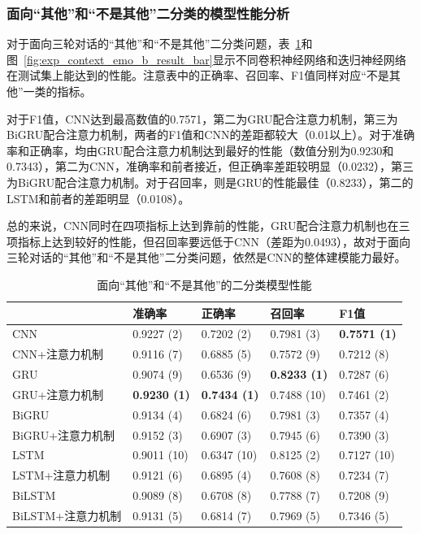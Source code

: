 \subsubsection{面向“其他”和“不是其他”二分类的模型性能分析}
\label{sssec:exp_context_emo_b_base}

对于面向三轮对话的“其他”和“不是其他”二分类问题，表~\ref{tab:exp_context_emo_b_result}和图~\ref{fig:exp_context_emo_b_result_bar}显示不同卷积神经网络和迭归神经网络在测试集上能达到的性能。注意表中的正确率、召回率、F1值同样对应“不是其他”一类的指标。

对于F1值，CNN达到最高数值的0.7571，第二为GRU配合注意力机制，第三为BiGRU配合注意力机制，两者的F1值和CNN的差距都较大（0.01以上）。对于准确率和正确率，均由GRU配合注意力机制达到最好的性能（数值分别为0.9230和0.7343），第二为CNN，准确率和前者接近，但正确率差距较明显（0.0232），第三为BiGRU配合注意力机制。对于召回率，则是GRU的性能最佳（0.8233），第二的LSTM和前者的差距明显（0.0108）。

总的来说，CNN同时在四项指标上达到靠前的性能，GRU配合注意力机制也在三项指标上达到较好的性能，但召回率要远低于CNN（差距为0.0493），故对于面向三轮对话的“其他”和“不是其他”二分类问题，依然是CNN的整体建模能力最好。

\begin{table}[htb]
  \centering
  \begin{minipage}[t]{\linewidth}
  \caption{面向“其他”和“不是其他”的二分类模型性能}
  \label{tab:exp_context_emo_b_result}
    \begin{tabularx}{\linewidth}{X|llll}
    \toprule[1.5pt]
    & 准确率 & 正确率 & 召回率 & F1值 \\
    \hline
    CNN & 0.9227 (2) & 0.7202 (2) & 0.7981 (3) & \bf 0.7571 (1) \\ %
    CNN+注意力机制 & 0.9116 (7) & 0.6885 (5) & 0.7572 (9) & 0.7212 (8) \\ %
    \hline
    GRU & 0.9074 (9) & 0.6536 (9) & \bf 0.8233 (1) & 0.7287 (6) \\ %
    GRU+注意力机制 & \bf 0.9230 (1) & \bf 0.7434 (1) & 0.7488 (10) & 0.7461 (2) \\ %
    \hline
    BiGRU & 0.9134 (4) & 0.6824 (6) & 0.7981 (3) & 0.7357 (4) \\ %
    BiGRU+注意力机制 & 0.9152 (3) & 0.6907 (3) & 0.7945 (6) & 0.7390 (3) \\ %
    \hline
    LSTM & 0.9011 (10) & 0.6347 (10) & 0.8125 (2) & 0.7127 (10) \\ %
    LSTM+注意力机制 & 0.9121 (6) & 0.6895 (4) & 0.7608 (8) & 0.7234 (7) \\ %
    \hline
    BiLSTM & 0.9089 (8) & 0.6708 (8) & 0.7788 (7) & 0.7208 (9) \\ %
    BiLSTM+注意力机制 & 0.9131 (5) & 0.6814 (7) & 0.7969 (5) & 0.7346 (5) \\ %
    \bottomrule[1.5pt]
    \end{tabularx}
  \end{minipage}
\end{table}

